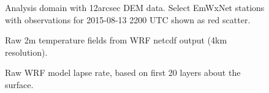 \documentclass{article}
\begin{document}
\begin{landscape}
\pagestyle{empty}

\begin{figure}
\caption{Analysis domain with 12arcsec DEM data. Select EmWxNet stations with observations for 2015-08-13 2200 UTC shown as red scatter.}\label{fig:dem} 
\end{figure}

\begin{figure}
\caption{Raw 2m temperature fields from WRF netcdf output (4km resolution).}\label{fig:rawtemp} 
\end{figure}

\begin{figure}
\caption{Raw WRF model lapse rate, based on first 20 layers about the surface.}\label{fig:lapse}
\end{figure}


\end{landscape}
\end{document}
